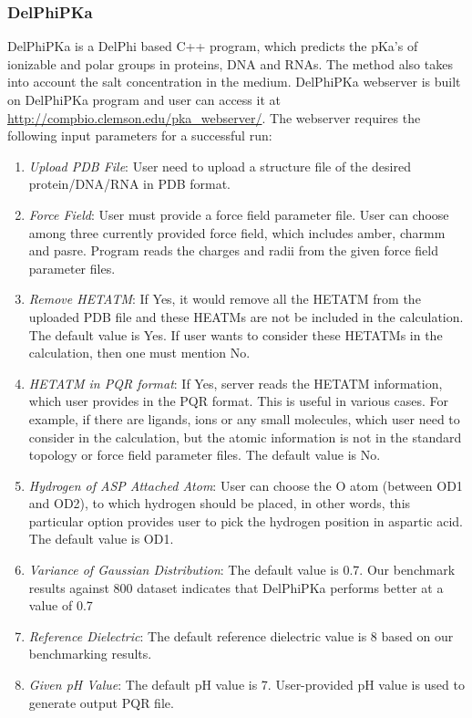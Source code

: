 \documentclass[9pt,tutorial]{livecoms}
\begin{document}
\subsubsection{DelPhiPKa}
DelPhiPKa\cite{wang2015pka} is a DelPhi based C++ program, which predicts the pKa’s of ionizable and polar groups in proteins, DNA and RNAs. The method also takes into account the salt concentration in the medium\cite{pahari2018delphipka}. DelPhiPKa webserver is built on DelPhiPKa program and user can access it at \url{http://compbio.clemson.edu/pka_webserver/}. The webserver requires the following input parameters for a successful run:
\begin{enumerate}
    \item \textit{ Upload PDB File}: User need to upload a structure file of the desired protein/DNA/RNA in PDB format.
    \item \textit{ Force Field}: User must provide a force field parameter file. User can choose among three currently provided force field, which includes amber, charmm and pasre. Program reads the charges and radii from the given force field parameter files.
    \item \textit{ Remove HETATM}: If Yes, it would remove all the HETATM from the uploaded PDB file and these HEATMs are not be included in the calculation. The default value is Yes. If user wants to consider these HETATMs in the calculation, then one must mention No.
    \item \textit{ HETATM in PQR format}: If Yes, server reads the HETATM information, which user provides in the PQR format. This is useful in various cases. For example, if there are ligands, ions or any small molecules, which user need to consider in the calculation, but the atomic information is not in the standard topology or force field parameter files. The default value is No. 
    \item \textit{Hydrogen of ASP Attached Atom}: User can choose the O atom (between OD1 and OD2), to which hydrogen should be placed, in other words, this particular option provides user to pick the hydrogen position in aspartic acid. The default value is OD1.
    \item \textit{ Variance of Gaussian Distribution}: The default value is 0.7. Our benchmark results against 800 dataset indicates that DelPhiPKa performs better at a value of 0.7 
    \item \textit{ Reference Dielectric}: The default reference dielectric value is 8 based on our benchmarking results. 
    \item \textit{ Given pH Value}: The default pH value is 7. User-provided pH value is used to generate output PQR file.

\end{enumerate}
\end{document}
